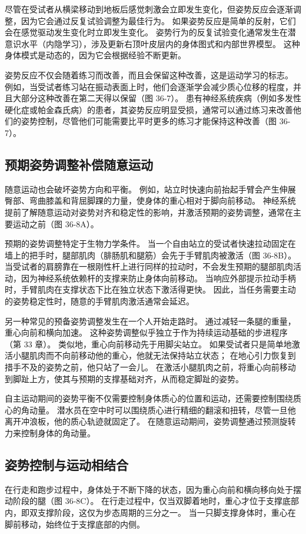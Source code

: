 尽管在受试者从横梁移动到地板后感觉刺激会立即发生变化，但姿势反应会逐渐调整，因为它会通过反复试验调整为最佳行为。 如果姿势反应是简单的反射，它们会在感觉驱动发生变化时立即发生变化。 姿势行为的反复试验变化通常发生在潜意识水平（内隐学习），涉及更新右顶叶皮层内的身体图式和内部世界模型。 这种身体模式是动态的，因为它会根据经验不断更新。

姿势反应不仅会随着练习而改善，而且会保留这种改善，这是运动学习的标志。 例如，当受试者练习站在振动表面上时，他们会逐渐学会减少质心位移的程度，并且大部分这种改善在第二天得以保留（图 36-7）。 患有神经系统疾病（例如多发性硬化症或帕金森氏病）的患者，其姿势反应明显受损，通常可以通过练习来改善他们的姿势控制，尽管他们可能需要比平时更多的练习才能保持这种改善（图 36-7）。

\subsection{预期姿势调整补偿随意运动}
随意运动也会破坏姿势方向和平衡。 例如，站立时快速向前抬起手臂会产生伸展臀部、弯曲膝盖和背屈脚踝的力量，使身体的重心相对于脚向前移动。 神经系统提前了解随意运动对姿势对齐和稳定性的影响，并激活预期的姿势调整，通常在主要运动之前（图 36-8A）。

预期的姿势调整特定于生物力学条件。 当一个自由站立的受试者快速拉动固定在墙上的把手时，腿部肌肉（腓肠肌和腿筋）会先于手臂肌肉被激活（图 36-8B）。 当受试者的肩膀靠在一根刚性杆上进行同样的拉动时，不会发生预期的腿部肌肉活动，因为神经系统依赖杆的支撑来防止身体向前移动。 当响应外部提示拉动手柄时，手臂肌肉在支撑状态下比在独立状态下激活得更快。 因此，当任务需要主动的姿势稳定性时，随意的手臂肌肉激活通常会延迟。

另一种常见的预备姿势调整发生在一个人开始走路时。 通过减轻一条腿的重量，重心向前和横向加速。 这种姿势调整似乎独立于作为持续运动基础的步进程序（第 33 章）。 类似地，重心向前移动先于用脚尖站立。 如果受试者只是简单地激活小腿肌肉而不向前移动他的重心，他就无法保持站立状态； 在地心引力恢复到措手不及的姿势之前，他只站了一会儿。 在激活小腿肌肉之前，将重心向前移动到脚趾上方，使其与预期的支撑基础对齐，从而稳定脚趾的姿势。

自主运动期间的姿势平衡不仅需要控制身体质心的位置和运动，还需要控制围绕质心的角动量。 潜水员在空中时可以围绕质心进行精细的翻滚和扭转，尽管一旦他离开冲浪板，他的质心轨迹就固定了。 在随意运动期间，姿势调整通过预测旋转力来控制身体的角动量。

\subsection{姿势控制与运动相结合}
在行走和跑步过程中，身体处于不断下降的状态，因为重心向前和横向移向处于摆动阶段的腿（图 36-8C）。 在行走过程中，仅当双脚着地时，重心才位于支撑底部内，即双支撑阶段，这仅为步态周期的三分之一。 当一只脚支撑身体时，重心在脚前移动，始终位于支撑底部的内侧。

